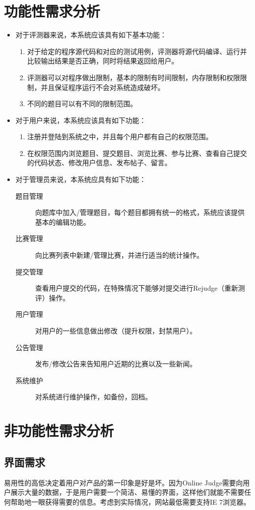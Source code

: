 \section{功能性需求分析}
\begin{itemize}
\item 对于评测器来说，本系统应该具有如下基本功能：
\begin{enumerate}
	\item 对于给定的程序源代码和对应的测试用例，评测器将源代码编译、运行并比较输出结果是否正确，同时将结果返回给用户。
	\item 评测器可以对程序做出限制，基本的限制有时间限制，内存限制和权限限制，并且保证程序运行不会对系统造成破坏。
	\item 不同的题目可以有不同的限制范围。
\end{enumerate}
\item 对于用户来说，本系统应该具有如下功能：
\begin{enumerate}
	\item 注册并登陆到系统之中，并且每个用户都有自己的权限范围。
	\item 在权限范围内浏览题目、提交题目、浏览比赛、参与比赛、查看自己提交的代码状态、修改用户信息、发布帖子、留言。
\end{enumerate}
\item 对于管理员来说，本系统应具有如下功能：
\begin{description}
	\item[题目管理] 向题库中加入/管理题目，每个题目都拥有统一的格式，系统应该提供基本的编辑功能。
	\item[比赛管理] 向比赛列表中新建/管理比赛，并进行适当的统计操作。
	\item[提交管理] 查看用户提交的代码，在特殊情况下能够对提交进行Rejudge（重新测评）操作。
	\item[用户管理] 对用户的一些信息做出修改（提升权限，封禁用户）。
	\item[公告管理] 发布/修改公告来告知用户近期的比赛以及一些新闻。
	\item[系统维护] 对系统进行维护操作，如备份，回档。
\end{description}
\end{itemize}


\section{非功能性需求分析}
\subsection{界面需求}
易用性的高低决定着用户对产品的第一印象是好是坏。因为Online Judge需要向用户展示大量的数据，于是用户需要一个简洁、易懂的界面，这样他们就能不需要任何帮助地一眼获得需要的信息。考虑到实际情况，网站最低需要支持IE 7浏览器。

